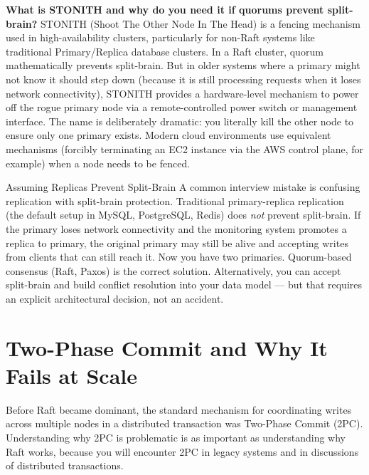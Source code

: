 \documentclass[11pt,a4paper]{article}
\begin{document}
\begin{thinkbox}
\textbf{What is STONITH and why do you need it if quorums prevent split-brain?} STONITH (Shoot The Other Node In The Head) is a fencing mechanism used in high-availability clusters, particularly for non-Raft systems like traditional Primary/Replica database clusters. In a Raft cluster, quorum mathematically prevents split-brain. But in older systems where a primary might not know it should step down (because it is still processing requests when it loses network connectivity), STONITH provides a hardware-level mechanism to power off the rogue primary node via a remote-controlled power switch or management interface. The name is deliberately dramatic: you literally kill the other node to ensure only one primary exists. Modern cloud environments use equivalent mechanisms (forcibly terminating an EC2 instance via the AWS control plane, for example) when a node needs to be fenced.
\end{thinkbox}

\begin{trapbox}{Assuming Replicas Prevent Split-Brain}
A common interview mistake is confusing replication with split-brain protection. Traditional primary-replica replication (the default setup in MySQL, PostgreSQL, Redis) does \textit{not} prevent split-brain. If the primary loses network connectivity and the monitoring system promotes a replica to primary, the original primary may still be alive and accepting writes from clients that can still reach it. Now you have two primaries. Quorum-based consensus (Raft, Paxos) is the correct solution. Alternatively, you can accept split-brain and build conflict resolution into your data model --- but that requires an explicit architectural decision, not an accident.
\end{trapbox}

\section{Two-Phase Commit and Why It Fails at Scale}

Before Raft became dominant, the standard mechanism for coordinating writes across multiple nodes in a distributed transaction was Two-Phase Commit (2PC). Understanding why 2PC is problematic is as important as understanding why Raft works, because you will encounter 2PC in legacy systems and in discussions of distributed transactions.
\end{document}
